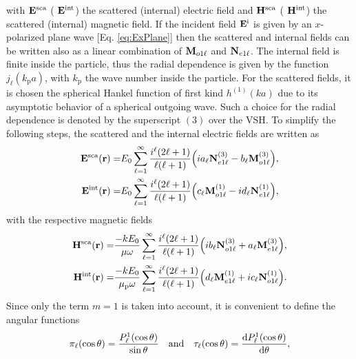 with  $\vb{E}^\text{sca}$ ( $\vb{E}^\text{int}$) the scattered (internal) electric field and  $\vb{H}^\text{sca}$ ( $\vb{H}^\text{int}$) the scattered (internal) magnetic field. If the incident field $\vb{E}^\text{i}$ is given by an $x$-polarized plane wave [Eq. \eqref{eq:ExPlane}] then the scattered and internal fields can be written also as a linear combination of $\vb{M}_{o1\ell}$ and $\vb{N}_{e1\ell}$. The internal field is finite inside the particle, thus the radial dependence is given by the function $j_\ell(k_\text{p} a)$, with $k_\text{p}$ the wave number inside the particle. For the scattered fields, it is chosen the spherical Hankel function of first kind $h^{(1)}(ka)$ due to its asymptotic behavior of a spherical outgoing wave. Such a choice for the radial dependence is denoted by the superscript $(3)$ over the VSH. To simplify the following steps, the scattered and the internal electric fields are written as
  \begin{subequations}
 \begin{align}
 \vb{E}^\text{sca} (\vb{r})=& E_0 \sum_{\ell = 1}^\infty\frac{i^\ell(2\ell+1)}{\ell(\ell+1)}\qty(i a_\ell \vb{N}_{e1\ell}^{(3)} -b_\ell \vb{M}_{o1\ell}^{(3)}),
 \label{eq:EscaLC}\\
 \vb{E}^\text{int} (\vb{r})=& E_0 \sum_{\ell = 1}^\infty\frac{i^\ell(2\ell+1)}{\ell(\ell+1)}\qty( c_\ell\vb{M}_{o1\ell}^{(1)} - i d_\ell \vb{N}_{e1\ell}^{(1)}),
 \label{eq:EscaInt}
  \end{align}%
   \label{eqs:EscaInt}
 \end{subequations}
with the respective magnetic fields
    \begin{subequations}
 \begin{align}
 \vb{H}^\text{sca} (\vb{r})=& \frac{-kE_0}{\mu\omega} \sum_{\ell = 1}^\infty\frac{i^\ell(2\ell+1)}{\ell(\ell+1)}\qty(i b_\ell \vb{N}_{o1\ell}^{(3)} +a_\ell \vb{M}_{e1\ell}^{(3)}),\\
 \vb{H}^\text{int} (\vb{r})=& \frac{-kE_0}{\mu_\text{p}\omega} \sum_{\ell = 1}^\infty\frac{i^\ell(2\ell+1)}{\ell(\ell+1)}\qty( d_\ell\vb{M}_{e1\ell}^{(1)} + i c_\ell \vb{N}_{o1\ell}^{(1)}).
 \end{align}%
\label{eq:HscaInt}%
 \end{subequations}%
Since only the term $m=1$ is taken into account, it is convenient to define the angular functions
%
\begin{align}
 \pi_\ell(\cos\theta )  = \frac{P_\ell^1(\cos\theta)}{\sin\theta}\qqtext{and}
 \tau_\ell(\cos\theta) = \dv{P_\ell^1(\cos\theta)}{\theta},
 \label{eq:PiTau}
\end{align}
